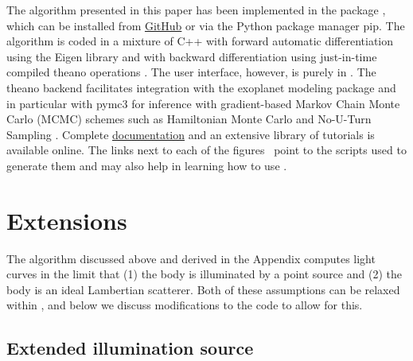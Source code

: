 \documentclass[modern]{aastex62}
\begin{document}
The algorithm presented in this paper has been implemented in the \Python
package \starry, which can be installed from
\href{https://github.com/rodluger/starry}{GitHub} or via the Python package
manager \textsf{pip}. The algorithm is coded in a mixture of \textsf{C++}
with forward automatic differentiation using the \textsf{Eigen} library
\citep{eigen} and \Python with backward differentiation using
just-in-time compiled \textsf{theano}
operations \citep{theano}. The user interface, however, is purely in
\Python. The \textsf{theano} backend facilitates integration with the
\textsf{exoplanet} modeling package \citep{exoplanet} and in particular
with \textsf{pymc3} \citep{pymc3} for inference with gradient-based
Markov Chain Monte Carlo (MCMC) schemes
such as Hamiltonian Monte Carlo \citep[HMC;][]{Duane1987}
and No-U-Turn Sampling \citep[NUTS;][]{Hoffman2011}.
%
Complete \href{https://rodluger.github.io/starry}{documentation} and an
extensive library of tutorials is available online.
The links next to each
of the figures \codeicon\, point to the \Python scripts used to generate
them and may also help in learning how to use \starry.

\section{Extensions}
\label{sec:extensions}

The algorithm discussed above and derived in the Appendix computes light
curves in the limit that (1) the body is illuminated by a point source
and (2) the body is an ideal Lambertian scatterer. Both of these
assumptions can be relaxed within \starry, and below we discuss modifications
to the code to allow for this.

\subsection{Extended illumination source}
\label{sec:extended}
\end{document}
